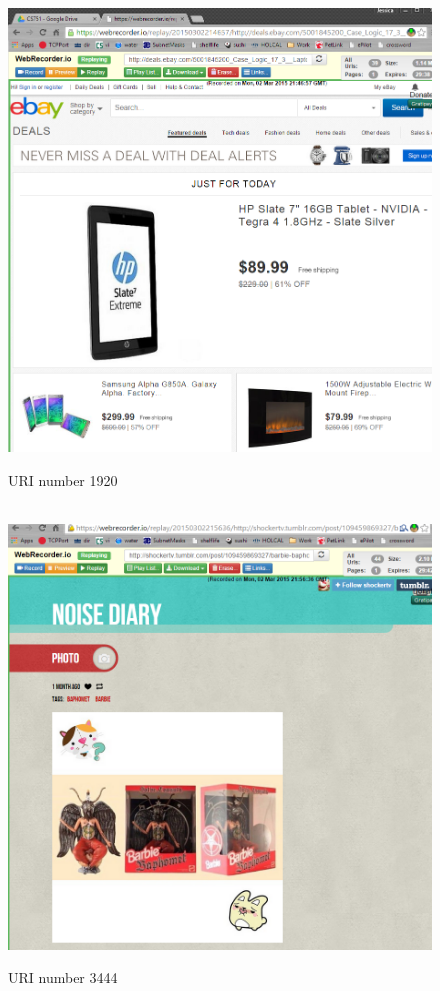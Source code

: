 \documentclass[12pt]{article}
\begin{document}
\begin{figure}[H]
    \caption{URI number 1920}
    \centering
    \includegraphics[scale=0.5]{ebaydealsreplay.PNG}
\end{figure}

\begin{figure}[H]
    \caption{URI number 3444}
    \centering
    \includegraphics[scale=0.5]{shockertvreplay.PNG}
\end{figure}
\end{document}
